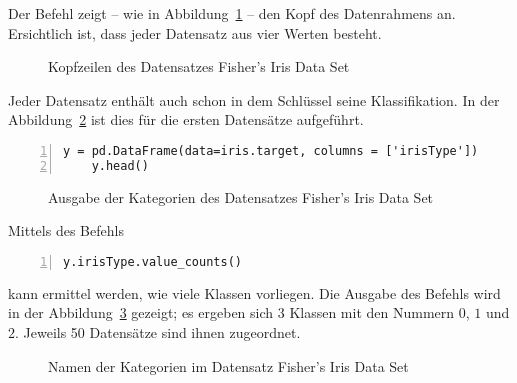 Der Befehl  zeigt -- wie in Abbildung~\ref{TensorFlowHead} -- den Kopf des Datenrahmens an. Ersichtlich ist, dass jeder Datensatz aus vier Werten besteht. 

\begin{figure}[H]
    \caption{Kopfzeilen des Datensatzes Fisher's Iris Data Set}\label{TensorFlowHead}
\end{figure}

Jeder Datensatz enthält auch schon in dem Schlüssel  seine Klassifikation. In der Abbildung~\ref{TensorFlowHeadType} ist dies für die ersten Datensätze aufgeführt.

\begin{lstlisting}[language=MyPython, numbers=left]
    y = pd.DataFrame(data=iris.target, columns = ['irisType'])
    y.head()
\end{lstlisting}

\begin{figure}[H]
    \caption{Ausgabe der Kategorien des Datensatzes Fisher's Iris Data Set}\label{TensorFlowHeadType}
\end{figure}

Mittels des Befehls 

\begin{lstlisting}[language=MyPython, numbers=left]
    y.irisType.value_counts()
\end{lstlisting}

kann ermittel werden, wie viele Klassen vorliegen. Die Ausgabe des Befehls wird in der Abbildung~\ref{TensorFlowIrisTypes}
gezeigt; es ergeben sich 3 Klassen mit den Nummern $0$, $1$ und $2$. Jeweils 50 Datensätze sind ihnen zugeordnet.

\begin{figure}[H]
    \caption{Namen der Kategorien im Datensatz Fisher's Iris Data Set}\label{TensorFlowIrisTypes}
\end{figure}
